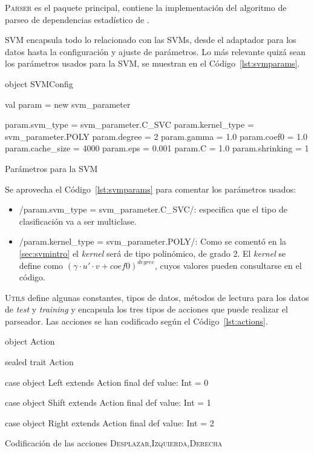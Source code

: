 \textsc{Parser} es el paquete principal, contiene la implementación del
algoritmo de parseo de dependencias estadístico de \citeauthor{yamada2003}.

\textsc{SVM} encapsula todo lo relacionado con las \acp{SVM}, desde el adaptador
para los datos hasta la configuración y ajuste de parámetros. Lo más relevante
quizá sean los parámetros usados para la \ac{SVM}, se muestran en el
Código~\ref{lst:svmparams}.
\begin{listing}[ht]
  \begin{scalacode}
    object SVMConfig {
      val param = new svm_parameter

      param.svm_type = svm_parameter.C_SVC
      param.kernel_type = svm_parameter.POLY
      param.degree = 2
      param.gamma = 1.0
      param.coef0 = 1.0
      param.cache_size = 4000
      param.eps = 0.001
      param.C = 1.0
      param.shrinking = 1
    }
  \end{scalacode}
  \caption{Parámetros para la \ac{SVM}}
  \label{lst:svmparams}
\end{listing}
Se aprovecha el Código~\ref{lst:svmparams} para comentar los parámetros usados:
\begin{itemize}
\item \scalainline/param.svm_type = svm_parameter.C_SVC/: especifica que el tipo
  de clasificación va a ser multiclase.
\item \scalainline/param.kernel_type = svm_parameter.POLY/: Como se comentó en
  la \autoref{sec:svmintro} el \emph{kernel} será de tipo polinómico, de grado
  2. El \emph{kernel} se define como $(\gamma\cdot u'\cdot v + coef0)^{degree}$,
  cuyos valores pueden consultarse en el código.
\end{itemize}

\textsc{Utils} define algunas constantes, tipos de datos, métodos de lectura
para los datos de \emph{test} y \emph{training} y encapsula los tres tipos de
acciones que puede realizar el parseador. Las acciones se han codificado según
el Código~\ref{lst:actions}.
\begin{listing}[ht]
  \begin{scalacode}
    object Action {

      sealed trait Action

      case object Left extends Action {
        final def value: Int = 0
      }

      case object Shift extends Action {
        final def value: Int = 1
      }

      case object Right extends Action {
        final def value: Int = 2
      }
    }
  \end{scalacode}
  \caption{\footnotesize Codificación de las acciones \textsc{Desplazar,Izquierda,Derecha}}
  \label{lst:actions}
\end{listing}

